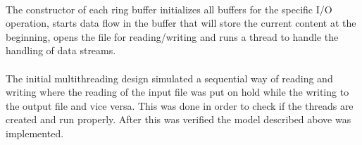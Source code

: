 	\paragraph{}
		The constructor of each ring buffer initializes all buffers for the specific I/O operation, starts data flow in the buffer that will store the current content at the beginning, opens the file for reading/writing and runs a thread to handle the handling of data streams.
		
	\paragraph{}
		The initial multithreading design simulated a sequential way of reading and writing where the reading of the input file was put on hold while the writing to the output file and vice versa. This was done in order to check if the threads are created and run properly. After this was verified the model described above was implemented.